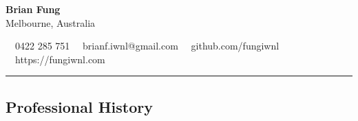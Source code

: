 \documentclass[11pt,letterpaper]{article}
\begin{document}
\begin{center}
	{\LARGE \textbf{Brian Fung}}\\
	Melbourne, Australia
	\vspace{0.1cm}
	\\
\end{center}

\begin{center}
	\vspace{0.01cm}
	\raisebox{-0.2\height} {\Large \faPhoneSquare} \ \  0422 285 751 \hfill\raisebox{-0.2\height}{\Large \faEnvelopeSquare} \ \ brianf.iwnl@gmail.com \hfill \raisebox{-0.2\height}{\Large \faGithubSquare} \ \ github.com/fungiwnl \hfill \raisebox{-0.2\height}{\Large \faGlobe} \ \ https://fungiwnl.com
\end{center}

\hrule
\vspace{-1em}
\vspace{0.6cm}
\subsection*{\Large Professional History}
\end{document}
